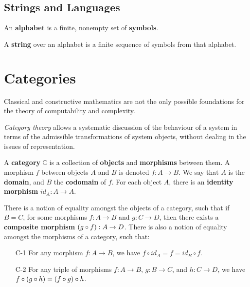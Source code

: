 
\subsection{Strings and Languages}

\begin{definition} An \textbf{alphabet} is a finite, nonempty set of
\textbf{symbols}.  \end{definition}

\begin{definition} A \textbf{string} over an alphabet is a finite sequence of
symbols from that alphabet. \end{definition}


\section{Categories}

Classical and constructive mathematics are not the only possible foundations
for the theory of computability and complexity.

\emph{Category theory} allows a systematic discussion of the behaviour of a
system in terms of the admissible transformations of system objects, without
dealing in the issues of representation.

\begin{specification} A \textbf{category} $\mathbb{C}$ is a collection of
\textbf{objects} and \textbf{morphisms} between them. A morphism $f$ between
objects $A$ and $B$ is denoted $f:A\rightarrow B$. We say that $A$ is the
\textbf{domain}, and $B$ the \textbf{codomain} of $f$. For each object $A$,
there is an \textbf{identity morphism} $id_A:A\rightarrow A$.

There is a notion of equality amongst the objects of a category, such that if
$B=C$, for some morphisms $f : A\rightarrow B$ and $g : C \rightarrow D$, then
there exists a \textbf{composite morphism} $\mathopen{}\left({g\circ f}\right)\mathclose{} : A \rightarrow D$.
There is also a notion of equality amongst the morphisms of a category, such
that:

\begin{enumerate}

\item [C-1] For any morphism $f:A\rightarrow B$, we have $f\circ id_A = f =
id_B \circ f$.

\item [C-2] For any triple of morphisms $f : A \rightarrow B$, $g : B
\rightarrow C$, and $h : C \rightarrow D$, we have $f\circ \mathopen{}\left({g \circ h}\right)\mathclose{} =
\mathopen{}\left({f\circ g}\right)\mathclose{} \circ h$.

\end{enumerate}

\end{specification}

